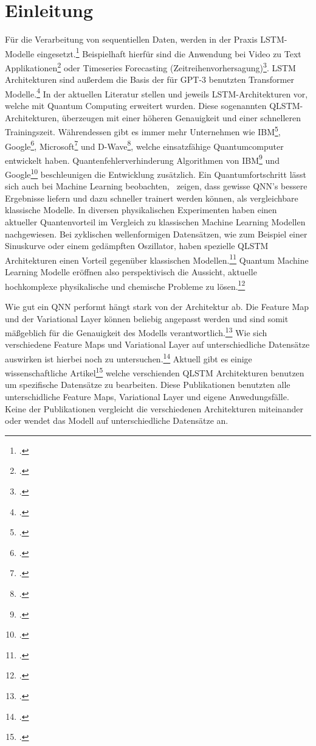 \chapter{Einleitung}

Für die Verarbeitung von sequentiellen Daten, werden in der Praxis \ac{LSTM}-Modelle eingesetzt.\footcite[Vgl.][]{Sutskever2014} Beispielhaft hierfür sind die Anwendung bei Video zu Text Applikationen\footcite[Vgl.][]{Venugopalan2015} oder Timeseries Forecasting (Zeitreihenvorhersagung)\footcite[Vgl.][]{Chen2022}.
LSTM Architekturen sind außerdem die Basis der für GPT-3 benutzten Transformer Modelle.\footcite[Vgl.][S. 1ff.]{Vaswani2017}
In der aktuellen Literatur stellen \cite{Chen2022} und \cite{Yu2023} jeweils \ac{LSTM}-Architekturen vor, welche mit Quantum Computing erweitert wurden. Diese sogenannten \ac{QLSTM}-Architekturen, überzeugen mit einer höheren Genauigkeit und einer schnelleren Trainingszeit.
Währendessen gibt es immer mehr Unternehmen wie IBM\footcite[Vgl.][]{IBMQa}, Google\footcite[Vgl.][]{GoogleQa}, Microsoft\footcite[Vgl.][]{MicrosoftQ} und D-Wave\footcite[Vgl.][]{DWaveQ}, welche einsatzfähige Quantumcomputer entwickelt haben. Quantenfehlerverhinderung Algorithmen von IBM\footcite[Vgl.][]{Kim2023} und Google\footcite[Vgl.][]{Acharya2023} beschleunigen die Entwicklung zusätzlich.
Ein Quantumfortschritt lässt sich auch bei Machine Learning beobachten,~\cite{Abbas2021} zeigen, dass gewisse \ac{QNN}'s bessere Ergebnisse liefern und dazu schneller trainert werden können, als vergleichbare klassische Modelle.
In diversen physikalischen Experimenten haben \cite{Huang2021} einen aktueller Quantenvorteil im Vergleich zu klassischen Machine Learning Modellen nachgewiesen. 
Bei zyklischen wellenformigen Datensätzen, wie zum Beispiel einer Sinuskurve oder einem gedämpften Oszillator, haben spezielle \ac{QLSTM} Architekturen einen Vorteil gegenüber klassischen Modellen.\footcite[Vgl.][]{Chen2022}
Quantum Machine Learning Modelle eröffnen also perspektivisch die Aussicht, aktuelle hochkomplexe physikalische und chemische Probleme zu lösen.\footcite[Vgl.][S. 1]{Huang2021}

Wie gut ein \ac{QNN} performt hängt stark von der Architektur ab. Die Feature Map und der Variational Layer können beliebig angepasst werden und sind somit mäßgeblich für die Genauigkeit des Modells verantwortlich.\footcite[Vgl.][S. 404]{Abbas2021}
Wie sich verschiedene Feature Maps und Variational Layer auf unterschiedliche Datensätze auswirken ist hierbei noch zu untersuchen.\footcite[Vgl.][S. 407]{Abbas2021}
Aktuell gibt es einige wissenschaftliche Artikel\footcite[Vgl.][]{Chen2022,Yu2023,Qi2021} welche verschienden \ac{QLSTM} Architekturen benutzen um spezifische Datensätze zu bearbeiten. 
Diese Publikationen benutzten alle unterschidliche Feature Maps, Variational Layer und eigene Anwedungsfälle. Keine der Publikationen vergleicht die verschiedenen Architekturen miteinander oder wendet das Modell auf unterschiedliche Datensätze an.

